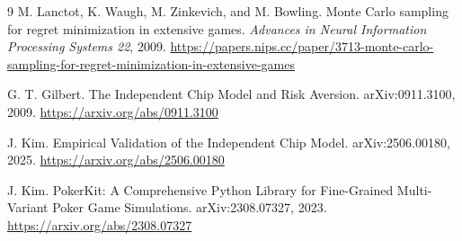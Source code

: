 \documentclass[10pt]{article}
\begin{document}
\clearpage
\begin{thebibliography}{9}
M. Lanctot, K. Waugh, M. Zinkevich, and M. Bowling.
Monte Carlo sampling for regret minimization in extensive games.
\emph{Advances in Neural Information Processing Systems 22}, 2009.
\url{https://papers.nips.cc/paper/3713-monte-carlo-sampling-for-regret-minimization-in-extensive-games}

G. T. Gilbert. The Independent Chip Model and Risk Aversion. arXiv:0911.3100, 2009.
\url{https://arxiv.org/abs/0911.3100}

J. Kim. Empirical Validation of the Independent Chip Model. arXiv:2506.00180, 2025.
\url{https://arxiv.org/abs/2506.00180}

J. Kim. PokerKit: A Comprehensive Python Library for Fine-Grained Multi-Variant Poker Game
Simulations. arXiv:2308.07327, 2023.
\url{https://arxiv.org/abs/2308.07327}
\end{thebibliography}
\end{document}
